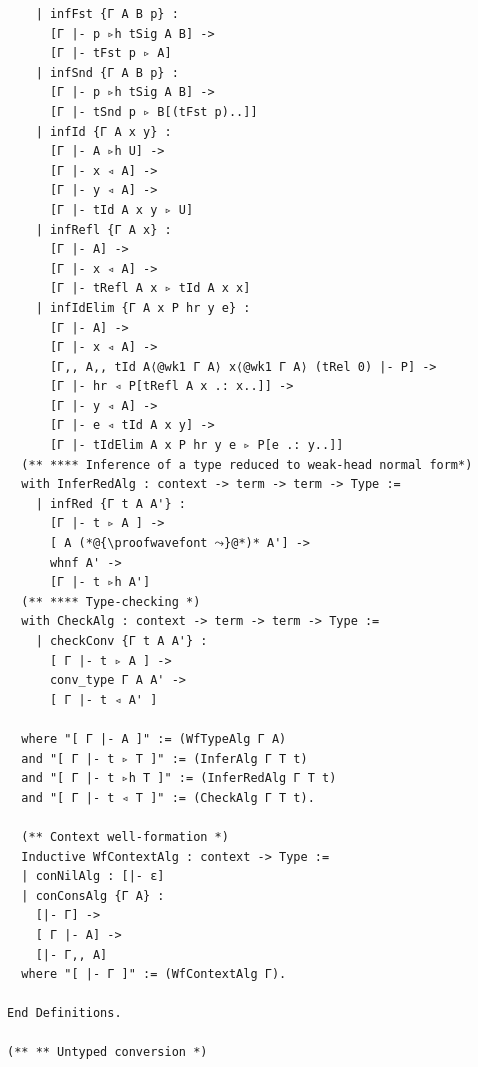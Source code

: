 \begin{lstlisting}
    | infFst {Γ A B p} :
      [Γ |- p ▹h tSig A B] ->
      [Γ |- tFst p ▹ A]
    | infSnd {Γ A B p} :
      [Γ |- p ▹h tSig A B] ->
      [Γ |- tSnd p ▹ B[(tFst p)..]]
    | infId {Γ A x y} :
      [Γ |- A ▹h U] ->
      [Γ |- x ◃ A] ->
      [Γ |- y ◃ A] ->
      [Γ |- tId A x y ▹ U]
    | infRefl {Γ A x} :
      [Γ |- A] ->
      [Γ |- x ◃ A] ->
      [Γ |- tRefl A x ▹ tId A x x]
    | infIdElim {Γ A x P hr y e} :
      [Γ |- A] ->
      [Γ |- x ◃ A] ->
      [Γ,, A,, tId A⟨@wk1 Γ A⟩ x⟨@wk1 Γ A⟩ (tRel 0) |- P] ->
      [Γ |- hr ◃ P[tRefl A x .: x..]] ->
      [Γ |- y ◃ A] ->
      [Γ |- e ◃ tId A x y] ->
      [Γ |- tIdElim A x P hr y e ▹ P[e .: y..]]
  (** **** Inference of a type reduced to weak-head normal form*)
  with InferRedAlg : context -> term -> term -> Type :=
    | infRed {Γ t A A'} :
      [Γ |- t ▹ A ] ->
      [ A (*@{\proofwavefont ⤳}@*)* A'] ->
      whnf A' ->
      [Γ |- t ▹h A']
  (** **** Type-checking *)
  with CheckAlg : context -> term -> term -> Type :=
    | checkConv {Γ t A A'} :
      [ Γ |- t ▹ A ] -> 
      conv_type Γ A A' ->
      [ Γ |- t ◃ A' ]

  where "[ Γ |- A ]" := (WfTypeAlg Γ A)
  and "[ Γ |- t ▹ T ]" := (InferAlg Γ T t)
  and "[ Γ |- t ▹h T ]" := (InferRedAlg Γ T t)
  and "[ Γ |- t ◃ T ]" := (CheckAlg Γ T t).

  (** Context well-formation *)
  Inductive WfContextAlg : context -> Type :=
  | conNilAlg : [|- ε]
  | conConsAlg {Γ A} :
    [|- Γ] ->
    [ Γ |- A] ->
    [|- Γ,, A]
  where "[ |- Γ ]" := (WfContextAlg Γ).

End Definitions.

(** ** Untyped conversion *)


\end{lstlisting}
